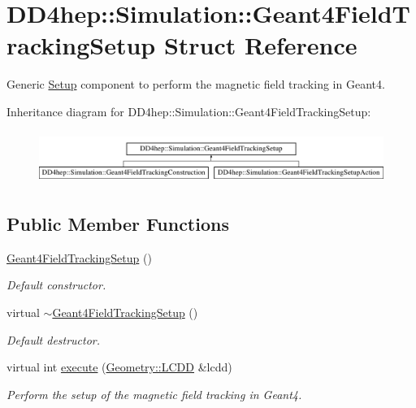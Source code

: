 \hypertarget{struct_d_d4hep_1_1_simulation_1_1_geant4_field_tracking_setup}{}\section{D\+D4hep\+:\+:Simulation\+:\+:Geant4\+Field\+Tracking\+Setup Struct Reference}
\label{struct_d_d4hep_1_1_simulation_1_1_geant4_field_tracking_setup}


Generic \hyperlink{namespace_d_d4hep_1_1_simulation_1_1_setup}{Setup} component to perform the magnetic field tracking in Geant4.  


Inheritance diagram for D\+D4hep\+:\+:Simulation\+:\+:Geant4\+Field\+Tracking\+Setup\+:\begin{figure}[H]
\begin{center}
\leavevmode
\includegraphics[height=1.733746cm]{struct_d_d4hep_1_1_simulation_1_1_geant4_field_tracking_setup}
\end{center}
\end{figure}
\subsection*{Public Member Functions}
\begin{DoxyCompactItemize}
\item 
\hyperlink{struct_d_d4hep_1_1_simulation_1_1_geant4_field_tracking_setup_a282e719af272a3ea7fff2e80b5501539}{Geant4\+Field\+Tracking\+Setup} ()
\begin{DoxyCompactList}\small\item\em Default constructor. \end{DoxyCompactList}\item 
virtual \hyperlink{struct_d_d4hep_1_1_simulation_1_1_geant4_field_tracking_setup_a2ada20da4d69771adbef82115109712e}{$\sim$\+Geant4\+Field\+Tracking\+Setup} ()
\begin{DoxyCompactList}\small\item\em Default destructor. \end{DoxyCompactList}\item 
virtual int \hyperlink{struct_d_d4hep_1_1_simulation_1_1_geant4_field_tracking_setup_a357240d7fa878959f164ab2050598b8e}{execute} (\hyperlink{class_d_d4hep_1_1_geometry_1_1_l_c_d_d}{Geometry\+::\+L\+C\+DD} \&lcdd)
\begin{DoxyCompactList}\small\item\em Perform the setup of the magnetic field tracking in Geant4. \end{DoxyCompactList}\end{DoxyCompactItemize}
